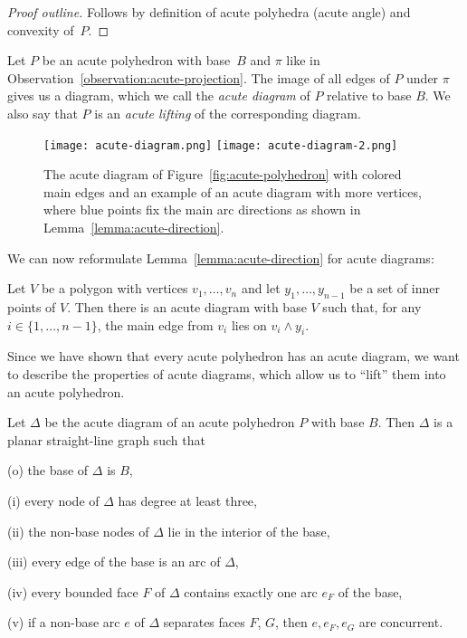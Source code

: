 \begin{proof}[Proof outline]
  Follows by definition of acute polyhedra (acute angle) and convexity of~$P$.
\end{proof}

\begin{definition}
  Let $P$ be an acute polyhedron with base~$B$ and $\pi$ like in Observation~\ref{observation:acute-projection}.
  The image of all edges of $P$ under $\pi$ gives us a diagram, which we call the \emph{acute diagram} of $P$ relative to base $B$. 
  We also say that $P$ is an \emph{acute lifting} of the corresponding diagram.
\end{definition}

\begin{figure}[ht]
  \centering
  \texttt{[image: acute-diagram.png]}
  \hspace*{5mm}
  \texttt{[image: acute-diagram-2.png]}
  \caption{The acute diagram of Figure~\ref{fig:acute-polyhedron} with colored main edges and an example of an acute diagram with more vertices, where blue points fix the main arc directions as shown in Lemma~\ref{lemma:acute-direction}.}
  \label{fig:acute-diagram}
\end{figure}

We can now reformulate Lemma~\ref{lemma:acute-direction} for acute diagrams:

\begin{corollary}\label{corollary:acute-direction}
  Let $V$ be a polygon with vertices $v_1,\dots,v_n$ and let $y_1,\dots,y_{n-1}$ be a set of inner points of $V$.
  Then there is an acute diagram with base $V$ such that, for any $i \in \{1,\dots,n-1\}$, the main edge from $v_i$ lies on $v_i \wedge y_i$.
\end{corollary}

Since we have shown that every acute polyhedron has an acute diagram, we want to describe the properties of acute diagrams, which allow us to ``lift'' them into an acute polyhedron.

\begin{lemma}\label{lemma:diagram-properties}
  Let $\Delta$ be the acute diagram of an acute polyhedron $P$ with base $B$.
  Then $\Delta$ is a planar straight-line graph such that

  (o) the base of $\Delta$ is $B$,
  
  (i) every node of $\Delta$ has degree at least three,

  (ii) the non-base nodes of $\Delta$ lie in the interior of the base,

  (iii) every edge of the base is an arc of $\Delta$,

  (iv) every bounded face $F$ of $\Delta$ contains exactly one arc $e_F$ of the base,

  (v) if a non-base arc $e$ of $\Delta$ separates faces $F$, $G$, then $e, e_F, e_G$ are concurrent.
\end{lemma}

